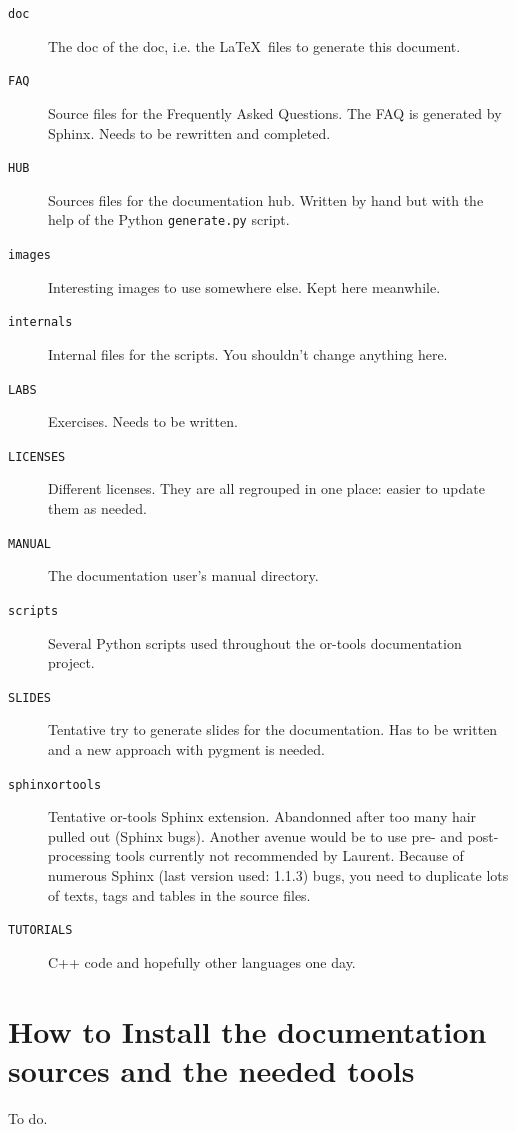 \documentclass[a4paper,10pt]{article}
\newcommand{\code}[1]{\texttt{#1}}
\begin{document}
\begin{description}
 \item[\code{doc}] The doc of the doc, i.e. the \LaTeX\ files to generate this document.
 \item[\code{FAQ}] Source files for the Frequently Asked Questions. The FAQ is generated by Sphinx. Needs to be rewritten and completed.
 \item[\code{HUB}] Sources files for the documentation hub. Written by hand but with the help of the Python \code{generate.py} script.
\item[\code{images}] Interesting images to use somewhere else. Kept here meanwhile.
 \item[\code{internals}] Internal files for the scripts. You shouldn't change anything here.
 \item[\code{LABS}] Exercises. Needs to be written.
\item[\code{LICENSES}] Different licenses. They are all regrouped in one place: easier to update them as needed.
\item[\code{MANUAL}] The documentation user's manual directory.
\item[\code{scripts}] Several Python scripts used throughout the or-tools documentation project.
\item[\code{SLIDES}] Tentative try to generate slides for the documentation. Has to be written and a new approach with pygment is needed.
\item[\code{sphinxortools}] Tentative or-tools Sphinx extension. Abandonned after too many hair pulled out (Sphinx bugs).
Another avenue would be to use pre- and post-processing tools currently not recommended by Laurent. Because of 
numerous Sphinx (last version used: 1.1.3) bugs, you need to duplicate lots of texts, tags and tables in the source files.
\item[\code{TUTORIALS}] C++ code and hopefully other languages one day.
\end{description}



\section{How to Install the documentation sources and the needed tools}
\label{installation}

To do.
\end{document}
